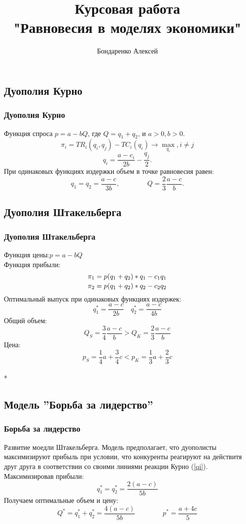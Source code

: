 \documentclass {beamer}
\title{Курсовая работа\\ "Равновесия в моделях экономики"}
\author { Бондаренко Алексей}
\date{}
\begin{document}
\begin{frame}
\maketitle
\end{frame}

\begin{frame}
\section{Дуополия Курно}
\frametitle{Дуополия Курно}
Функция спроса $p=a-bQ$, где $Q=q_1+q_2$, и $a>0,b>0.$ $$\pi_i=TR_i(q_i,q_j)-TC_i(q_i)\to \max_{q_i} ,i\ne j$$
\begin{equation} \label{qi}  q_i = \frac{a-c_i}{2b}-\frac {q_j}{2}.  \end{equation}
При одинаковых функциях издержки объем в точке равновесия равен: $$q_1 =q_2 = \frac {a-c}{3b}, \qquad\qquad Q=\frac{2}{3}\frac{a-c}{b}.$$
\end{frame}

\begin{frame}
\section{Дуополия Штакельберга}
\frametitle{Дуополия Штакельберга}
Функция цены:\qquad\quad $p=a-bQ$ \\Функция прибыли: $${\pi_1 = p(q_1+q_2)*q_1-c_1 q_1 \atop \pi_2 = p(q_1+q_2)*q_2-c_2 q_2 }$$ Оптимальный выпуск при одинаковых функциях издержек:$$q^*_1=\frac{a-c}{2b} \quad q^*_2=\frac{a-c}{4b}$$\newpage Общий объем: $$Q_S=\frac{3}{4}\frac{a-c}{b}>Q_K=\frac{2}{3}\frac{a-c}{b} $$ Цена:$$ p_S=\frac{1}{4}a+\frac{3}{4}c<p_K=\frac{1}{3}a+\frac{2}{3}c$$\\*
\end{frame}

\begin{frame}
\section{Модель ''Борьба за лидерство''}
\frametitle{Борьба за лидерство}
Развитие моедли Штакельберга. Модель предполагает, что дуополисты максимизируют прибыль при условии, что конкуренты реагируют на действитя друг друга в соответствии со своими линиями реакции Курно (\ref{qi}). Максимизировав прибыли: $$q_1^* = q_2^* = \frac{2(a-c)}{5b} $$ Получаем оптимальные объем и цену: $$ Q^*=q_1^*+q_2^* = \frac{4(a-c)}{5b} \qquad \qquad p^*=\frac{a+4c}{5}$$
\end{frame}
\end{document}
